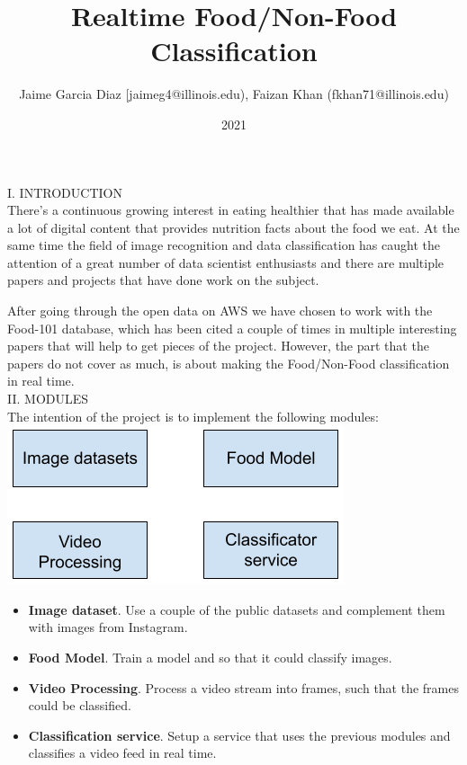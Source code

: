 \documentclass{IEEEtran}
\title{Realtime Food/Non-Food Classification}
\author{Jaime Garcia Diaz [jaimeg4@illinois.edu), Faizan Khan (fkhan71@illinois.edu)}
\date{2021}
\begin{document}
\begin{titlepage}
\maketitle
\end{titlepage}


\begin{abstract}

\end{abstract}


I. INTRODUCTION\\

There's a continuous growing interest in eating healthier that has made available a lot of digital content that provides nutrition facts about the food we eat. At the same time the field of image recognition and data classification has caught the attention of a great number of data scientist enthusiasts and there are multiple papers and projects that have done work on the subject.

After going through the open data on AWS we have chosen to work with the Food-101 database, which has been cited a couple of times in multiple interesting papers that will help to get pieces of the project. However, the part that the papers do not cover as much, is about making the Food/Non-Food classification in real time.\\


II. MODULES\\

The intention of the project is to implement the following modules:\\

\includegraphics[scale=0.5]{modules}\\

\begin{itemize}
\item \textbf{Image dataset}.
Use a couple of the public datasets and complement them with images from Instagram. 

\item \textbf{Food Model}.
Train a model and so that it could classify images.

\item \textbf{Video Processing}.
Process a video stream into frames, such that the frames could be classified.

\item \textbf{Classification service}.
Setup a service that uses the previous modules and classifies a video feed in real time.\\
\end{itemize}
\end{document}
